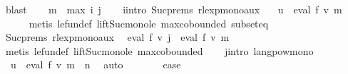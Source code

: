 \begin{isabellebody}
\ blast\isanewline
\ \ \isamarkupfalse%
\ {\isacharquery}{\kern0pt}m\ {\isacharequal}{\kern0pt}\ {\isachardoublequoteopen}max\ i\ j{\isachardoublequoteclose}\isanewline
\ \ \isamarkupfalse%
\ i{\isacharunderscore}{\kern0pt}intro\ Suc{\isachardot}{\kern0pt}prems{\isacharparenleft}{\kern0pt}{}{\isacharparenright}{\kern0pt}\ rlexp{\isacharunderscore}{\kern0pt}mono{\isacharunderscore}{\kern0pt}aux\ \isamarkupfalse%
\ {}{\isacharcolon}{\kern0pt}\ {\isachardoublequoteopen}u\ {\isasymin}\ eval\ f\ {\isacharparenleft}{\kern0pt}v\ {\isacharquery}{\kern0pt}m{\isacharparenright}{\kern0pt}{\isachardoublequoteclose}\isanewline
\ \ \ \ \isamarkupfalse%
\ {\isacharparenleft}{\kern0pt}metis\ le{\isacharunderscore}{\kern0pt}fun{\isacharunderscore}{\kern0pt}def\ lift{\isacharunderscore}{\kern0pt}Suc{\isacharunderscore}{\kern0pt}mono{\isacharunderscore}{\kern0pt}le\ max{\isachardot}{\kern0pt}cobounded{}\ subset{\isacharunderscore}{\kern0pt}eq{\isacharparenright}{\kern0pt}\isanewline
\ \ \isamarkupfalse%
\ Suc{\isachardot}{\kern0pt}prems{\isacharparenleft}{\kern0pt}{}{\isacharparenright}{\kern0pt}\ rlexp{\isacharunderscore}{\kern0pt}mono{\isacharunderscore}{\kern0pt}aux\ \isamarkupfalse%
\ {\isachardoublequoteopen}eval\ f\ {\isacharparenleft}{\kern0pt}v\ j{\isacharparenright}{\kern0pt}\ {\isasymsubseteq}\ eval\ f\ {\isacharparenleft}{\kern0pt}v\ {\isacharquery}{\kern0pt}m{\isacharparenright}{\kern0pt}{\isachardoublequoteclose}\isanewline
\ \ \ \ \isamarkupfalse%
\ {\isacharparenleft}{\kern0pt}metis\ le{\isacharunderscore}{\kern0pt}fun{\isacharunderscore}{\kern0pt}def\ lift{\isacharunderscore}{\kern0pt}Suc{\isacharunderscore}{\kern0pt}mono{\isacharunderscore}{\kern0pt}le\ max{\isachardot}{\kern0pt}cobounded{}{\isacharparenright}{\kern0pt}\isanewline
\ \ \isamarkupfalse%
\ j{\isacharunderscore}{\kern0pt}intro\ langpow{\isacharunderscore}{\kern0pt}mono\ \isamarkupfalse%
\ {}{\isacharcolon}{\kern0pt}\ {\isachardoublequoteopen}u{\isacharprime}{\kern0pt}\ {\isasymin}\ eval\ f\ {\isacharparenleft}{\kern0pt}v\ {\isacharquery}{\kern0pt}m{\isacharparenright}{\kern0pt}\ {\isacharcircum}{\kern0pt}{\isacharcircum}{\kern0pt}\ n{\isachardoublequoteclose}\ \isamarkupfalse%
\ auto\isanewline
\ \ \isamarkupfalse%
\ {}\ {}\ \isamarkupfalse%
\ {\isacharquery}{\kern0pt}case\ \isamarkupfalse%

\end{isabellebody}
